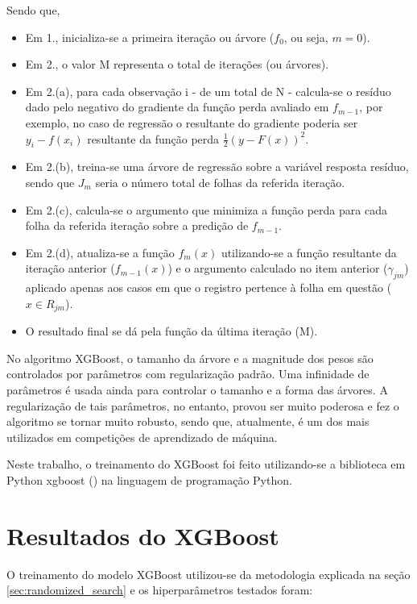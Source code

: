Sendo que,

\begin{itemize}
	\item Em 1., inicializa-se a primeira iteração ou árvore ($ f_0 $, ou seja, $ m=0 $).
	\item Em 2., o valor M representa o total de iterações (ou árvores).
	\item Em 2.(a), para cada observação i - de um total de N - calcula-se o resíduo dado pelo negativo do gradiente da função perda avaliado em $ f_{m-1} $, por exemplo, no caso de regressão o resultante do gradiente poderia ser $ y_i - f(x_i) $ resultante da função perda $ \frac{1}{2} (y - F(x))^{2} $.
	\item Em 2.(b), treina-se uma árvore de regressão sobre a variável resposta resíduo, sendo que $ J_m $ seria o número total de folhas da referida iteração.
	\item Em 2.(c), calcula-se o argumento que minimiza a função perda para cada folha da referida iteração sobre a predição de $ f_{m-1} $.
	\item Em 2.(d), atualiza-se a função $ f_m(x) $ utilizando-se a função resultante da iteração anterior ($ f_{m-1}(x) $) e o argumento calculado no item anterior ($ \gamma_{jm} $) aplicado apenas aos casos em que o registro pertence à folha em questão ($ x \in R_{jm} $).
	\item O resultado final se dá pela função da última iteração (M).
\end{itemize}

No algoritmo XGBoost, o tamanho da árvore e a magnitude dos pesos são controlados por parâmetros com regularização padrão. Uma infinidade de parâmetros é usada ainda para controlar o tamanho e a forma das árvores. A regularização de tais parâmetros, no entanto, provou ser muito poderosa e fez o algoritmo se tornar muito robusto, sendo que, atualmente, é um dos mais utilizados em competições de aprendizado de máquina.

Neste trabalho, o treinamento do XGBoost foi feito utilizando-se a biblioteca em Python xgboost (\citet{Xgboost}) na linguagem de programação Python.

\section{Resultados do XGBoost}
\label{sec:resultados_xgboost}

O treinamento do modelo XGBoost utilizou-se da metodologia explicada na seção \ref{sec:randomized_search} e os hiperparâmetros testados foram:

